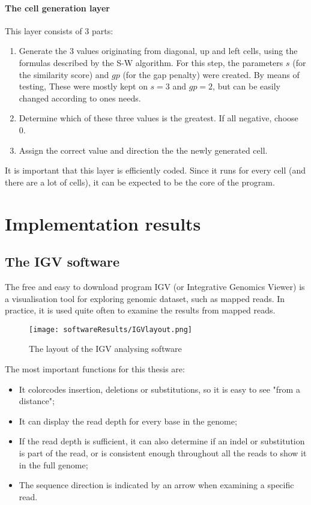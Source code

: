 \paragraph{The cell generation layer}
This layer consists of 3 parts:
\begin{enumerate}
	\item Generate the 3 values originating from diagonal, up and left cells, using the formulas described by the S-W algorithm. For this step, the parameters $s$ (for the similarity score) and $gp$ (for the gap penalty) were created. By means of testing, These were mostly kept on $s=3$ and $gp=2$, but can be easily changed according to ones needs.
	\item Determine which of these three values is the greatest. If all negative, choose 0.
	\item Assign the correct value and direction the the newly generated cell.
\end{enumerate}

It is important that this layer is efficiently coded. Since it runs for every cell (and there are a lot of cells), it can be expected to be the core of the program.

\section{Implementation results}

\subsection{The IGV software}

The free and easy to download program IGV (or Integrative Genomics Viewer) is a visualisation tool for exploring genomic dataset, such as mapped reads. In practice, it is used quite often to examine the results from mapped reads.

\begin{figure}[H]
	\centering
	\texttt{[image: softwareResults/IGVlayout.png]}
	\caption{The layout of the IGV analysing software}
	\label{fig:IGVlayout}
\end{figure}

The most important functions for this thesis are: 
\begin{itemize}
	\item It colorcodes insertion, deletions or substitutions, so it is easy to see "from a distance";
	\item It can display the read depth for every base in the genome;
	\item If the read depth is sufficient, it can also determine if an indel or substitution is part of the read, or is consistent enough throughout all the reads to show it in the full genome;
	\item The sequence direction is indicated by an arrow when examining a specific read.
\end{itemize}

